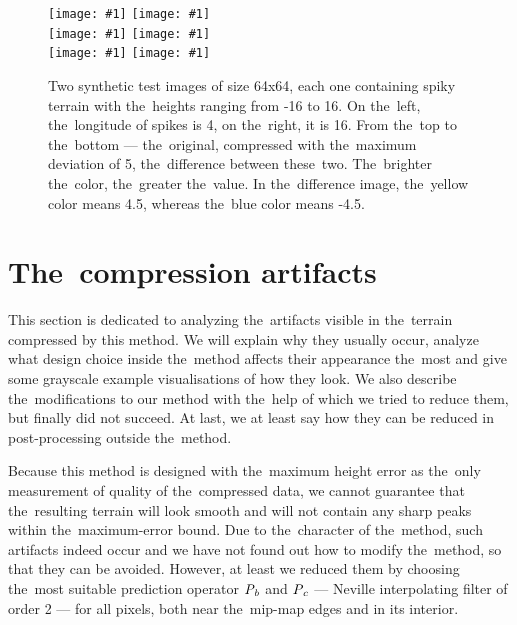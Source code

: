 \newcommand{\incexamplpair}[1]{\texttt{[image: \#1]}}

\begin{figure}
	\begin{center}
	\incexamplpair{figures/dim_64_amp_16_lon_4_horizontal_orig.png} 
	\incexamplpair{figures/dim_64_amp_16_lon_16_horizontal_orig.png} \\ 
	\incexamplpair{figures/dim_64_amp_16_lon_4_horizontal_out.png} 
	\incexamplpair{figures/dim_64_amp_16_lon_16_horizontal_out.png} \\ 
	\incexamplpair{figures/dim_64_amp_16_lon_4_horizontal_diff.png} 
	\incexamplpair{figures/dim_64_amp_16_lon_16_horizontal_diff.png}
    \end{center}
	\caption{Two synthetic test images of size 64x64, each one containing spiky terrain with the~heights ranging from -16 to 16. On the~left, the~longitude of spikes is 4, on the~right, it is 16. From the~top to the~bottom --- the~original, compressed with the~maximum deviation of 5, the~difference between these~two. The~brighter the~color, the~greater the~value. In the~difference image, the~yellow color means 4.5, whereas the~blue color means -4.5.}
	\label{fig:result_wave_samples}
\end{figure}

\section{The~compression artifacts}\label{sec:artifs}

This section is dedicated to analyzing the~artifacts visible in the~terrain compressed by this method. We will explain why they usually occur, analyze what design choice inside the~method affects their appearance the~most and give some grayscale example visualisations of how they look. We also describe the~modifications to our method with the~help of which we tried to reduce them, but finally did not succeed. At last, we at least say how they can be reduced in post-processing outside the~method.

Because this method is designed with the~maximum height error as the~only measurement of quality of the~compressed data, we cannot guarantee that the~resulting terrain will look smooth and will not contain any sharp peaks within the~maximum-error bound. Due to the~character of the~method, such artifacts indeed occur and we have not found out how to modify the~method, so that they can be avoided. However, at least we reduced them by choosing the~most suitable prediction operator $\mathit{P_{b}}$ and $\mathit{P_{c}}$ --- Neville interpolating filter of order 2 --- for all pixels, both near the~mip-map edges and in its interior.

